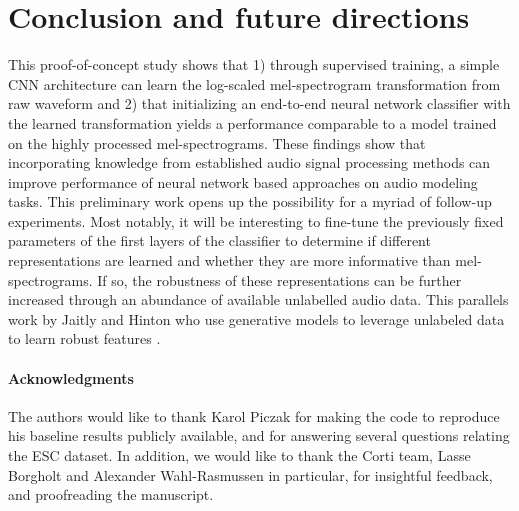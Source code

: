 \documentclass{article}
\begin{document}
\section{Conclusion and future directions}
This proof-of-concept study shows that 1) through supervised training, a simple CNN architecture can learn the log-scaled mel-spectrogram transformation from raw waveform and 2) that initializing an end-to-end neural network classifier with the learned transformation yields a performance comparable to a model trained on the highly processed mel-spectrograms. These findings show that incorporating knowledge from established audio signal processing methods can improve performance of neural network based approaches on audio modeling tasks. This preliminary work opens up the possibility for a myriad of follow-up experiments. Most notably, it will be interesting to fine-tune the previously fixed parameters of the first layers of the classifier to determine if different representations are learned and whether they are more informative than mel-spectrograms. If so, the robustness of these representations can be further increased through an abundance of available unlabelled audio data. This parallels work by Jaitly and Hinton who use generative models to leverage unlabeled data to learn robust features \cite{jaitly2011learning}.


\paragraph{Acknowledgments}
The authors would like to thank Karol Piczak for making the code to reproduce his baseline results publicly available, and for answering several questions relating the ESC dataset. In addition, we would like to thank the Corti team, Lasse Borgholt and Alexander Wahl-Rasmussen in particular, for insightful feedback, and proofreading the manuscript.
\newpage




\end{document}
